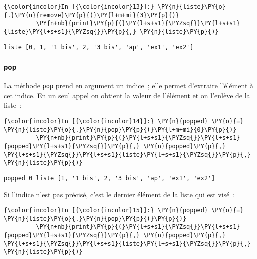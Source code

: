     \begin{Verbatim}[commandchars=\\\{\}]
{\color{incolor}In [{\color{incolor}13}]:} \PY{n}{liste}\PY{o}{.}\PY{n}{remove}\PY{p}{(}\PY{l+m+mi}{3}\PY{p}{)}
         \PY{n+nb}{print}\PY{p}{(}\PY{l+s+s1}{\PYZsq{}}\PY{l+s+s1}{liste}\PY{l+s+s1}{\PYZsq{}}\PY{p}{,} \PY{n}{liste}\PY{p}{)}
\end{Verbatim}


    \begin{Verbatim}[commandchars=\\\{\}]
liste [0, 1, '1 bis', 2, '3 bis', 'ap', 'ex1', 'ex2']

    \end{Verbatim}

    \hypertarget{pop}{%
\subsubsection{\texorpdfstring{\texttt{pop}}{pop}}\label{pop}}

    La méthode \texttt{pop} prend en argument un indice~; elle permet
d'extraire l'élément à cet indice. En un seul appel on obtient la valeur
de l'élément et on l'enlève de la liste~:

    \begin{Verbatim}[commandchars=\\\{\}]
{\color{incolor}In [{\color{incolor}14}]:} \PY{n}{popped} \PY{o}{=} \PY{n}{liste}\PY{o}{.}\PY{n}{pop}\PY{p}{(}\PY{l+m+mi}{0}\PY{p}{)}
         \PY{n+nb}{print}\PY{p}{(}\PY{l+s+s1}{\PYZsq{}}\PY{l+s+s1}{popped}\PY{l+s+s1}{\PYZsq{}}\PY{p}{,} \PY{n}{popped}\PY{p}{,} \PY{l+s+s1}{\PYZsq{}}\PY{l+s+s1}{liste}\PY{l+s+s1}{\PYZsq{}}\PY{p}{,} \PY{n}{liste}\PY{p}{)}
\end{Verbatim}


    \begin{Verbatim}[commandchars=\\\{\}]
popped 0 liste [1, '1 bis', 2, '3 bis', 'ap', 'ex1', 'ex2']

    \end{Verbatim}

    Si l'indice n'est pas précisé, c'est le dernier élément de la liste qui
est visé~:

    \begin{Verbatim}[commandchars=\\\{\}]
{\color{incolor}In [{\color{incolor}15}]:} \PY{n}{popped} \PY{o}{=} \PY{n}{liste}\PY{o}{.}\PY{n}{pop}\PY{p}{(}\PY{p}{)}
         \PY{n+nb}{print}\PY{p}{(}\PY{l+s+s1}{\PYZsq{}}\PY{l+s+s1}{popped}\PY{l+s+s1}{\PYZsq{}}\PY{p}{,} \PY{n}{popped}\PY{p}{,} \PY{l+s+s1}{\PYZsq{}}\PY{l+s+s1}{liste}\PY{l+s+s1}{\PYZsq{}}\PY{p}{,} \PY{n}{liste}\PY{p}{)}
\end{Verbatim}


